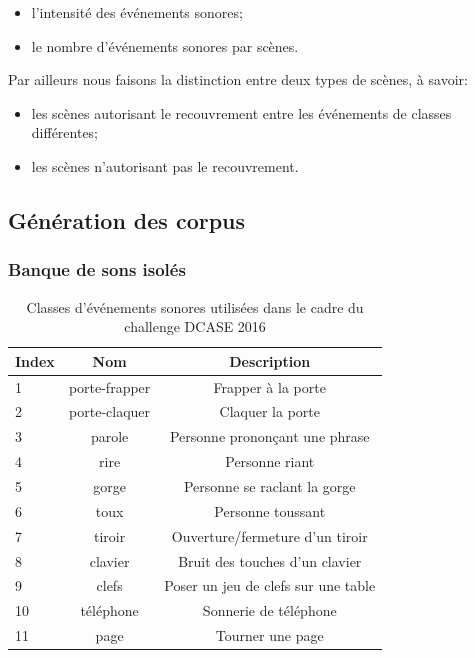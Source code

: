 \begin{itemize}
\item l'intensité des événements sonores;
\item le nombre d'événements sonores par scènes.
\end{itemize}

Par ailleurs nous faisons la distinction entre deux types de scènes, à savoir:

\begin{itemize}
\item les scènes autorisant le recouvrement entre les événements de classes différentes;
\item les scènes n'autorisant pas le recouvrement.
\end{itemize}

\subsection{Génération des corpus}

\subsubsection{Banque de sons isolés}

\begin{table}[t]
\begin{center}
\begin{tabular}{lcc}
\textbf{Index} & \textbf{Nom}  & \textbf{Description}  \\ 
\hline
1   & porte-frapper & Frapper à la porte \\
2   & porte-claquer & Claquer la porte \\
3   & parole        & Personne prononçant une phrase \\
4   & rire          & Personne riant  \\    
5   & gorge         & Personne se raclant la gorge  \\
6   & toux          & Personne toussant \\
7   & tiroir        & Ouverture/fermeture d'un tiroir \\
8   & clavier       & Bruit des touches d'un clavier \\
9   & clefs         & Poser un jeu de clefs sur une table \\    
10  & téléphone     & Sonnerie de téléphone \\
11  & page          & Tourner une page \\     
\hline      
\end{tabular}
\end{center}
\caption{Classes d'événements sonores utilisées dans le cadre du challenge DCASE 2016}
\label{tab:eventDCASE2016}
\end{table}

